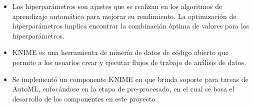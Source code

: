 \begin{itemize}
	\item Los hiperparámetros son ajustes que se realizan en los algoritmos de aprendizaje automático para mejorar su rendimiento. La optimización de hiperparámetros implica encontrar la combinación óptima de valores para los hiperparámetros.
	\item KNIME es una herramienta de minería de datos de código abierto que permite a los usuarios crear y ejecutar flujos de trabajo de análisis de datos.
	\item Se implementó un componente KNIME en \citep{Carrazana2022} que brinda soporte para tareas de AutoML, enfocándose en la etapa de pre-procesado, en el cual se basa el desarrollo de los componentes en este proyecto.
\end{itemize}




\pagebreak
